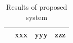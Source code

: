 \begin{table}[h!]
\begin{tabular}{ | c | c | c | c |}
\begin{minipage}{.3\textwidth}
\begin{center}
      \end{center}
    \end{minipage}
    &
      xxx
    & 
      yyy
    & 
      zzz
    \\ \hline
  \end{tabular}
  \caption{Results of proposed system}\label{tbl:myLboro}
\end{table}